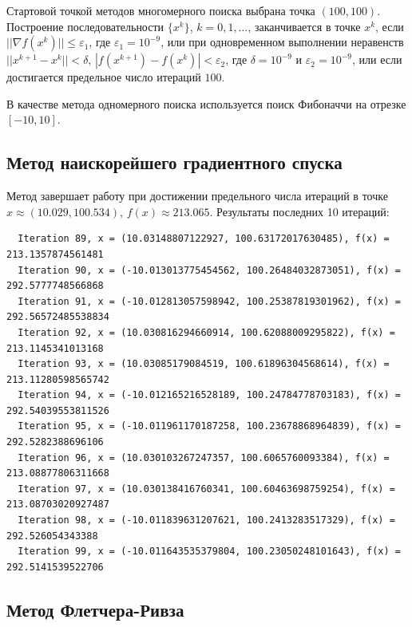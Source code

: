 \documentclass[a4paper, 14pt]{extarticle}
\begin{document}
Стартовой точкой методов многомерного поиска выбрана точка $(100, 100)$.
Построение последовательности $\{x^k\}$, $k = 0, 1, \ldots$, заканчивается в точке $x^k$, если $||\nabla f(x^k)|| \le \varepsilon_1$, где
$\varepsilon_1 = 10^{-9}$, или при одновременном выполнении неравенств $||x^{k+1} - x^k|| < \delta$, $|f(x^{k+1}) - f(x^k)| < \varepsilon_2$,
где $\delta = 10^{-9}$ и $\varepsilon_2 = 10^{-9}$, или если достигается предельное число итераций $100$.

В качестве метода одномерного поиска используется поиск Фибоначчи на отрезке $[-10, 10]$.

\subsection{Метод наискорейшего градиентного спуска}

Метод завершает работу при достижении предельного числа итераций в точке $x \approx (10.029, 100.534)$, $f(x) \approx 213.065$.
Результаты последних 10 итераций:
\begin{small}
\begin{Verbatim}
  Iteration 89, x = (10.03148807122927, 100.63172017630485), f(x) = 213.1357874561481
  Iteration 90, x = (-10.013013775454562, 100.26484032873051), f(x) = 292.5777748566868
  Iteration 91, x = (-10.012813057598942, 100.25387819301962), f(x) = 292.56572485538834
  Iteration 92, x = (10.030816294660914, 100.62088009295822), f(x) = 213.1145341013168
  Iteration 93, x = (10.03085179084519, 100.61896304568614), f(x) = 213.11280598565742
  Iteration 94, x = (-10.012165216528189, 100.24784778703183), f(x) = 292.54039553811526
  Iteration 95, x = (-10.011961170187258, 100.23678868964839), f(x) = 292.5282388696106
  Iteration 96, x = (10.030103267247357, 100.6065760093384), f(x) = 213.08877806311668
  Iteration 97, x = (10.030138416760341, 100.60463698759254), f(x) = 213.08703020927487
  Iteration 98, x = (-10.011839631207621, 100.2413283517329), f(x) = 292.526054343388
  Iteration 99, x = (-10.011643535379804, 100.23050248101643), f(x) = 292.5141539522706
\end{Verbatim}
\end{small}

\subsection{Метод Флетчера-Ривза}
\end{document}
